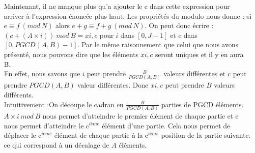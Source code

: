 Maintenant, il ne manque plus qu'a ajouter le c dans cette expression pour arriver à l'expression énoncée plus haut. Les propriétés du modulo nous donne : si $e ≡ f\ (mod\ N)$ alors $e+g ≡ f+g\ (mod\ N)$. On peut donc écrire : $(c +(A\times i))\ mod\ B = x{i,c}$ pour $i$ dans $[0, J-1]$ et c dans $[0, PGCD(A,B) -1]$. Par le même raisonnement que celui que nous avons présenté, nous pouvons dire que les éléments $x{i,c}$ seront uniques et il y en aura B.\\
En effet, nous savons que $i$ peut prendre $\frac{B}{PGCD(A,B)}$ valeurs différentes et c peut prendre $PGCD(A,B)$ valeur différentes. Donc $x{i,c}$ peut prendre $B$ valeurs différents.\\

Intuitivement :On découpe le cadran en $\frac{B}{PGCD(A,B)}$ parties de PGCD éléments. 
$A\times i\ mod\ B$ nous permet d'atteindre le premier élément de chaque partie et c nous permet d'atteindre le c$^{ième}$ élément d'une partie. 
Cela nous permet de déplacer le c$^{ième}$ élément de chaque partie à la c$^{ième}$ position de la partie suivante. ce qui correspond à un décalage de $A$ éléments. 